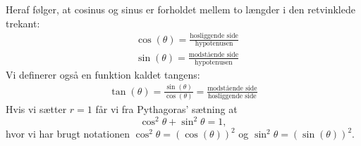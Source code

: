 %
Heraf følger, at cosinus og sinus er forholdet mellem to længder i den retvinklede trekant:
\begin{align} \label{mat:eq:trig}
    &\cos(\theta) = \frac{\text{hosliggende side}}{\text{hypotenusen}}\\
    &\sin(\theta) = \frac{\text{modstående side}}{\text{hypotenusen}}
\end{align}
Vi definerer også en funktion kaldet tangens:
\begin{align*}
    \tan(\theta) = \frac{\sin(\theta)}{\cos(\theta)} = \frac{\text{modstående side}}{\text{hosliggende side}}
\end{align*}
Hvis vi sætter $r=1$ får vi fra Pythagoras' sætning at
\begin{equation*}
    \cos^2 \theta + \sin^2 \theta = 1,
\end{equation*}
hvor vi har brugt notationen $\cos^2 \theta = (\cos(\theta))^2$ og
$\sin^2 \theta = (\sin(\theta))^2$.